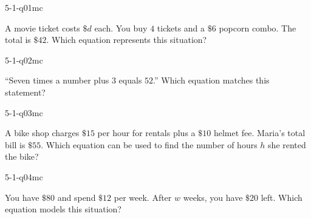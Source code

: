 

\begin{practiceQuestion}{5-1-q01}{mc}
\begin{questionText}
A movie ticket costs $\$d$ each. You buy $4$ tickets and a $\$6$ popcorn combo. The total is $\$42$. Which equation represents this situation?
\end{questionText}
\end{practiceQuestion}

\begin{practiceQuestion}{5-1-q02}{mc}
\begin{questionText}
``Seven times a number plus $3$ equals $52$.'' Which equation matches this statement?
\end{questionText}
\end{practiceQuestion}

\begin{practiceQuestion}{5-1-q03}{mc}
\begin{questionText}
A bike shop charges $\$15$ per hour for rentals plus a $\$10$ helmet fee. Maria's total bill is $\$55$. Which equation can be used to find the number of hours $h$ she rented the bike?
\end{questionText}
\end{practiceQuestion}

\begin{practiceQuestion}{5-1-q04}{mc}
\begin{questionText}
You have $\$80$ and spend $\$12$ per week. After $w$ weeks, you have $\$20$ left. Which equation models this situation?
\end{questionText}
\end{practiceQuestion}

